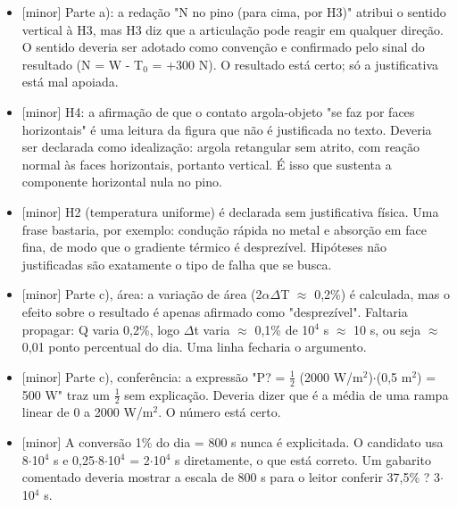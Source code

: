 \documentclass{article}%
\begin{document}
\begin{itemize}%
\item%
{[}minor{]} Parte a): a redação "N no pino (para cima, por H3)" atribui o sentido vertical à H3, mas H3 diz que a articulação pode reagir em qualquer direção. O sentido deveria ser adotado como convenção e confirmado pelo sinal do resultado (N = W - T$_{0}$ = +300 N). O resultado está certo; só a justificativa está mal apoiada.%
\item%
{[}minor{]} H4: a afirmação de que o contato argola{-}objeto "se faz por faces horizontais" é uma leitura da figura que não é justificada no texto. Deveria ser declarada como idealização: argola retangular sem atrito, com reação normal às faces horizontais, portanto vertical. É isso que sustenta a componente horizontal nula no pino.%
\item%
{[}minor{]} H2 (temperatura uniforme) é declarada sem justificativa física. Uma frase bastaria, por exemplo: condução rápida no metal e absorção em face fina, de modo que o gradiente térmico é desprezível. Hipóteses não justificadas são exatamente o tipo de falha que se busca.%
\item%
{[}minor{]} Parte c), área: a variação de área (2$\alpha$$\Delta$T $\approx$ 0,2\%) é calculada, mas o efeito sobre o resultado é apenas afirmado como "desprezível". Faltaria propagar: Q varia 0,2\%, logo $\Delta$t varia $\approx$ 0,1\% de 10$^{4}$ s $\approx$ 10 s, ou seja $\approx$ 0,01 ponto percentual do dia. Uma linha fecharia o argumento.%
\item%
{[}minor{]} Parte c), conferência: a expressão "P? = $\frac12$ (2000 W/m$^2$)$\cdot$(0,5 m$^2$) = 500 W" traz um $\frac12$ sem explicação. Deveria dizer que é a média de uma rampa linear de 0 a 2000 W/m$^2$. O número está certo.%
\item%
{[}minor{]} A conversão 1\% do dia = 800 s nunca é explicitada. O candidato usa 8$\cdot$10$^{4}$ s e 0,25$\cdot$8$\cdot$10$^{4}$ = 2$\cdot$10$^{4}$ s diretamente, o que está correto. Um gabarito comentado deveria mostrar a escala de 800 s para o leitor conferir 37,5\% ? 3$\cdot$10$^{4}$ s.%
\end{itemize}%
\end{document}
